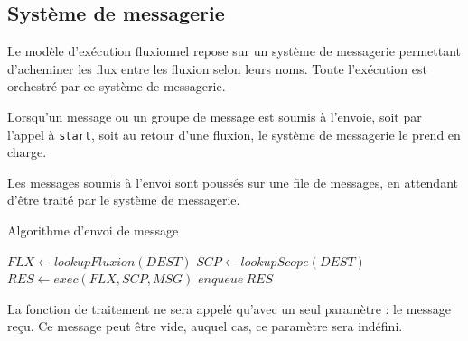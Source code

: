 


\subsection{Système de messagerie}

Le modèle d'exécution fluxionnel repose sur un système de messagerie permettant d'acheminer les flux entre les fluxion selon leurs noms.
Toute l'exécution est orchestré par ce système de messagerie.

Lorsqu'un message ou un groupe de message est soumis à l'envoie, soit par l'appel à \texttt{start}, soit au retour d'une fluxion, le système de messagerie le prend en charge.


Les messages soumis à l'envoi sont poussés sur une file de messages, en attendant d'être traité par le système de messagerie.

\begin{algorithm}
\caption{Algorithme d'envoi de message}
\begin{algorithmic}
\STATE $FLX \leftarrow lookupFluxion(DEST)$
\STATE $SCP \leftarrow lookupScope(DEST)$
\STATE $RES \leftarrow exec(FLX, SCP, MSG)$
\STATE $enqueue ~ RES$
\ENDFOR
\end{algorithmic}
\end{algorithm}

La fonction de traitement ne sera appelé qu'avec un seul paramètre : le message reçu.
Ce message peut être vide, auquel cas, ce paramètre sera indéfini.


